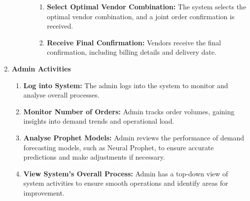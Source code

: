 \begin{enumerate}
\begin{enumerate}
\begin{itemize}
\begin{enumerate}
                                  \item \textbf{Select Optimal Vendor Combination:} The system selects the optimal vendor combination, and a joint order confirmation is received.
                                  \item \textbf{Receive Final Confirmation:} Vendors receive the final confirmation, including billing details and delivery date.
                              \end{enumerate}
                    \end{itemize}
          \end{enumerate}

    \item \textbf{Admin Activities}
          \begin{enumerate}
              \item \textbf{Log into System:} The admin logs into the system to monitor and analyse overall processes.
              \item \textbf{Monitor Number of Orders:} Admin tracks order volumes, gaining insights into demand trends and operational load.
              \item \textbf{Analyse Prophet Models:} Admin reviews the performance of demand forecasting models, such as Neural Prophet, to ensure accurate predictions and make adjustments if necessary.
              \item \textbf{View System's Overall Process:} Admin has a top-down view of system activities to ensure smooth operations and identify areas for improvement.
          \end{enumerate}
\end{enumerate}



